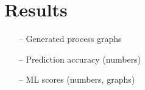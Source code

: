 \documentclass[english,12pt,a4paper,pdftex,sci,utf8]{aaltothesis}
\begin{document}















\clearpage
\section{Results}
\label{sec:results}


\begin{itemize}
\item[--]Generated process graphs
\item[--]Prediction accuracy (numbers)
\item[--]ML scores (numbers, graphs)
\end{itemize}
\end{document}
